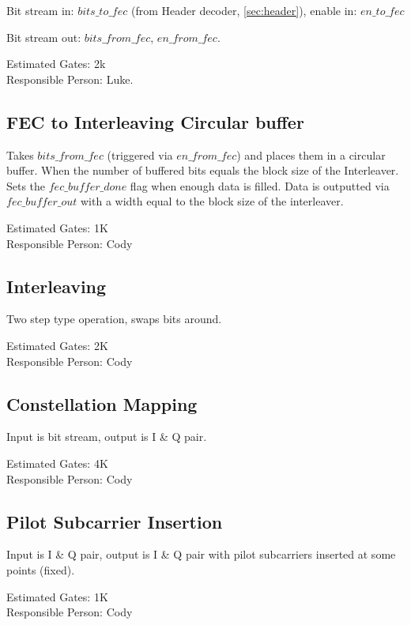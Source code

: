 \documentclass[10pt]{article}
\begin{document}
	Bit stream in: $bits\_to\_fec$ (from Header decoder, \autoref{sec:header}),
	enable in: $en\_to\_fec$

	Bit stream out: $bits\_from\_fec$, $en\_from\_fec$.

	Estimated Gates: 2k \\
	Responsible Person: Luke.

	\subsection{FEC to Interleaving Circular buffer}
	\label{sec:fec_buffer}

	Takes $bits\_from\_fec$ (triggered via $en\_from\_fec$) and places them
	in a circular buffer. When the number of buffered bits equals the block
	size of the Interleaver. Sets the $fec\_buffer\_done$ flag when enough
	data is filled. Data is outputted via $fec\_buffer\_out$ with a width
	equal to the block size of the interleaver.

	Estimated Gates: 1K \\
	Responsible Person: Cody

	\subsection{Interleaving}
	\label{sec:interleaving}

	Two step type operation, swaps bits around.

	Estimated Gates: 2K \\
	Responsible Person: Cody

	\subsection{Constellation Mapping}
	\label{sec:constellation}

	Input is bit stream, output is I \& Q pair.

	Estimated Gates: 4K \\
	Responsible Person: Cody

	\subsection{Pilot Subcarrier Insertion}
	\label{sec:pilot}

	Input is I \& Q pair, output is I \& Q pair with pilot subcarriers
	inserted at some points (fixed).

	Estimated Gates: 1K \\
	Responsible Person: Cody
\end{document}
